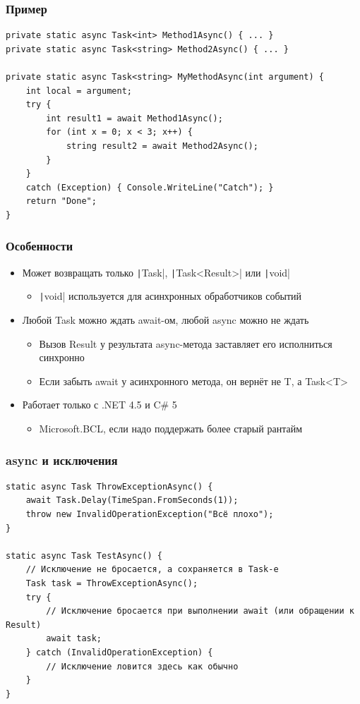 \documentclass[xetex,mathserif,serif]{beamer}
\begin{document}
	\begin{frame}[fragile]
		\frametitle{Пример}
		\begin{small}
			\begin{verbatim}
private static async Task<int> Method1Async() { ... }
private static async Task<string> Method2Async() { ... }

private static async Task<string> MyMethodAsync(int argument) {
    int local = argument;
    try {
        int result1 = await Method1Async();
        for (int x = 0; x < 3; x++) {
            string result2 = await Method2Async();
        }
    }
    catch (Exception) { Console.WriteLine("Catch"); }
    return "Done";
}
			\end{verbatim}
		\end{small}
	\end{frame}

	\begin{frame}
		\frametitle{Особенности}
		\begin{itemize}
			\item Может возвращать только \texttt|Task|, \texttt|Task<Result>| или \texttt|void|
			\begin{itemize}
				\item \texttt|void| используется для асинхронных обработчиков событий
			\end{itemize}
			\item Любой Task можно ждать await-ом, любой async можно не ждать
			\begin{itemize}
				\item Вызов Result у результата async-метода заставляет его исполниться синхронно
				\item Если забыть await у асинхронного метода, он вернёт не T, а Task<T>
			\end{itemize}
			\item Работает только с .NET 4.5 и C\# 5
			\begin{itemize}
				\item Microsoft.BCL, если надо поддержать более старый рантайм
			\end{itemize}
		\end{itemize}
	\end{frame}

	\begin{frame}[fragile]
		\frametitle{async и исключения}
		\begin{footnotesize}
			\begin{verbatim}
static async Task ThrowExceptionAsync() {
    await Task.Delay(TimeSpan.FromSeconds(1));
    throw new InvalidOperationException("Всё плохо");
}

static async Task TestAsync() {
    // Исключение не бросается, а сохраняется в Task-е
    Task task = ThrowExceptionAsync();
    try {
        // Исключение бросается при выполнении await (или обращении к Result)
        await task;
    } catch (InvalidOperationException) {
        // Исключение ловится здесь как обычно
    }
}
			\end{verbatim}
		\end{footnotesize}
	\end{frame}
\end{document}
